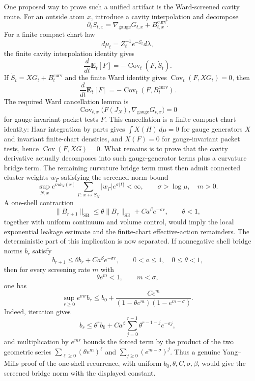 One proposed way to prove such a unified artifact is the Ward-screened cavity
route. For an outside atom $x$, introduce a cavity interpolation and decompose
\[
  \partial_t S_{t,x}
  =
  \nabla_{\mathrm{gauge}}G_{t,x}+B^{\mathrm{curv}}_{t,x}.
\]
For a finite compact chart law
\[
  d\mu_t=Z_t^{-1}e^{-S_t}d\lambda,
\]
the finite cavity interpolation identity gives
\[
  \frac{d}{dt}\mathbf E_t[F]
  =
  -\operatorname{Cov}_t(F,\dot S_t).
\]
If $\dot S_t=XG_t+B^{\mathrm{curv}}_t$ and the finite Ward identity gives
$\operatorname{Cov}_t(F,XG_t)=0$, then
\[
  \frac{d}{dt}\mathbf E_t[F]
  =
  -\operatorname{Cov}_t(F,B^{\mathrm{curv}}_t).
\]
The required Ward cancellation lemma is
\[
  \operatorname{Cov}_{t,x}
  \bigl(F(J_N),\nabla_{\mathrm{gauge}}G_{t,x}\bigr)=0
\]
for gauge-invariant packet tests $F$. This cancellation is a finite compact
chart identity: Haar integration by parts gives
$\int X(H)\,d\mu=0$ for gauge generators $X$ and invariant finite-chart
densities, and $X(F)=0$ for gauge-invariant packet tests, hence
$\operatorname{Cov}(F,XG)=0$. What remains is to prove that the cavity
derivative actually decomposes into such gauge-generator terms plus a curvature
bridge term. The remaining curvature bridge term must then admit connected
cluster weights $w_\Gamma$ satisfying the screened norm bound
\[
  \sup_{N,x}
  e^{m k_N(x)}
  \sum_{\Gamma:\,x\leftrightarrow S_N}
  |w_\Gamma|e^{\sigma|\Gamma|}
  <\infty,
  \qquad \sigma>\log\mu,\quad m>0.
\]
A one-shell contraction
\[
  \|B_{r+1}\|_{\mathrm{SB}}
  \leq
  \theta\|B_r\|_{\mathrm{SB}}+Ca^\beta e^{-\sigma r},
  \qquad \theta<1,
\]
together with uniform continuum and volume control, would imply the local
exponential leakage estimate and the finite-chart effective-action remainders.
The deterministic part of this implication is now separated. If nonnegative
shell bridge norms $b_r$ satisfy
\[
  b_{r+1}\leq\theta b_r+Ca^\beta e^{-\sigma r},
  \qquad 0<a\leq1,\quad 0\leq\theta<1,
\]
then for every screening rate $m$ with
\[
  \theta e^m<1,\qquad m<\sigma,
\]
one has
\[
  \sup_{r\geq0}e^{mr}b_r
  \leq
  b_0+
  \frac{Ce^m}{(1-\theta e^m)(1-e^{m-\sigma})}.
\]
Indeed, iteration gives
\[
  b_r\leq
  \theta^r b_0+
  Ca^\beta\sum_{j=0}^{r-1}\theta^{r-1-j}e^{-\sigma j},
\]
and multiplication by $e^{mr}$ bounds the forced term by the product of the
two geometric series
$\sum_{\ell\geq0}(\theta e^m)^\ell$ and
$\sum_{j\geq0}(e^{m-\sigma})^j$. Thus a genuine Yang--Mills proof of the
one-shell recurrence, with uniform $b_0,\theta,C,\sigma,\beta$, would give the
screened bridge norm with the displayed constant.

